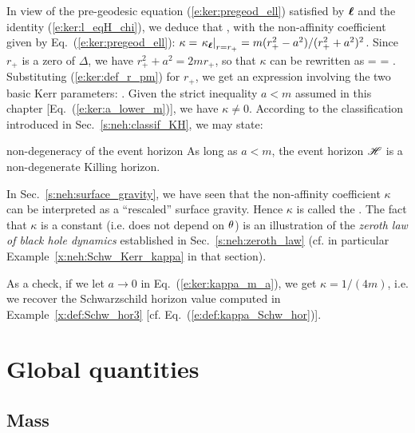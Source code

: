 In view of the pre-geodesic equation (\ref{e:ker:pregeod_ell}) satisfied
by $\bm{\ell}$ and the identity (\ref{e:ker:l_eqH_chi}), we deduce that
\be \label{e:ker:pregeod_chi}
    \encadre{ \wnab_{\w{\chi}}\, \w{\chi} \equalH \kappa \, \w{\chi} },
\ee
with the non-affinity coefficient given by Eq.~(\ref{e:ker:pregeod_ell}):
$\kappa = \left. \kappa_{\bm{\ell}} \right| _{r=r_+} = m(r_+^2-a^2)/(r_+^2+a^2)^2$.
Since $r_+$ is a zero of $\Delta$, we have $r_+^2 + a^2 = 2 m r_+$, so that
$\kappa$ can be rewritten as
\be \label{e:ker:kappa_rp_m_a}
    \kappa =  =  .
\ee
Substituting (\ref{e:ker:def_r_pm}) for $r_+$, we get an expression involving
the two basic Kerr parameters:
\be \label{e:ker:kappa_m_a}
     .
\ee
Given the strict inequality $a<m$ assumed in this chapter [Eq.~(\ref{e:ker:a_lower_m})],
we have $\kappa\not=0$. According to the classification introduced in
Sec.~\ref{s:neh:classif_KH}, we may state:
\begin{tprop}{non-degeneracy of the event horizon}{}
As long as $a<m$, the event horizon $\mathscr{H}$ is a non-degenerate Killing horizon.
\end{tprop}
In Sec.~\ref{s:neh:surface_gravity}, we have seen that the non-affinity coefficient
$\kappa$ can be interpreted as a ``rescaled'' surface gravity. Hence $\kappa$
is called
the .
The fact that $\kappa$ is a constant (i.e. does not depend on $\theta$) is
an illustration of the \emph{zeroth law of black hole dynamics}
established in Sec.~\ref{s:neh:zeroth_law} (cf. in particular
Example~\ref{x:neh:Schw_Kerr_kappa} in that section).
\begin{remark}
As a check, if we let $a\rightarrow 0$ in Eq.~(\ref{e:ker:kappa_m_a}), we get
$\kappa = 1/(4m)$, i.e. we recover the Schwarzschild horizon value computed in
Example~\ref{x:def:Schw_hor3} [cf. Eq.~(\ref{e:def:kappa_Schw_hor})].
\end{remark}



\section{Global quantities} \label{s:ker:global_quantities}

\subsection{Mass} \label{s:ker:Komar_mass}

